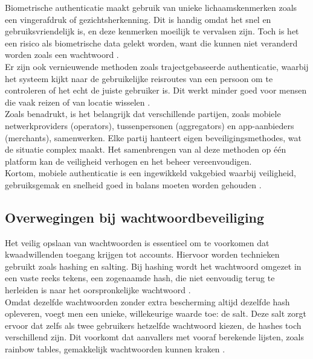 Biometrische authenticatie maakt gebruik van unieke lichaamskenmerken zoals een vingerafdruk of gezichtsherkenning. Dit is handig omdat het snel en gebruiksvriendelijk is, en deze kenmerken moeilijk te vervalsen zijn. Toch is het een risico als biometrische data gelekt worden, want die kunnen niet veranderd worden zoals een wachtwoord \autocite{Zukarnain2022}.\\

Er zijn ook vernieuwende methoden zoals trajectgebaseerde authenticatie, waarbij het systeem kijkt naar de gebruikelijke reisroutes van een persoon om te controleren of het echt de juiste gebruiker is. Dit werkt minder goed voor mensen die vaak reizen of van locatie wisselen \autocite{Zukarnain2022}.\\

Zoals \textcite{Zukarnain2022} benadrukt, is het belangrijk dat verschillende partijen, zoals mobiele netwerkproviders (operators), tussenpersonen (aggregators) en app-aanbieders (merchants), samenwerken. Elke partij hanteert eigen beveiligingsmethodes, wat de situatie complex maakt. Het samenbrengen van al deze methoden op één platform kan de veiligheid verhogen en het beheer vereenvoudigen.\\

Kortom, mobiele authenticatie is een ingewikkeld vakgebied waarbij veiligheid, gebruiksgemak en snelheid goed in balans moeten worden gehouden \autocite{Zukarnain2022, Gao2023}.\\


\subsection{Overwegingen bij wachtwoordbeveiliging}
Het veilig opslaan van wachtwoorden is essentieel om te voorkomen dat kwaadwillenden toegang krijgen tot accounts. Hiervoor worden technieken gebruikt zoals hashing en salting. Bij hashing wordt het wachtwoord omgezet in een vaste reeks tekens, een zogenaamde hash, die niet eenvoudig terug te herleiden is naar het oorspronkelijke wachtwoord \autocite{Gupta2022}.\\

Omdat dezelfde wachtwoorden zonder extra bescherming altijd dezelfde hash opleveren, voegt men een unieke, willekeurige waarde toe: de salt. Deze salt zorgt ervoor dat zelfs als twee gebruikers hetzelfde wachtwoord kiezen, de hashes toch verschillend zijn. Dit voorkomt dat aanvallers met vooraf berekende lijsten, zoals rainbow tables, gemakkelijk wachtwoorden kunnen kraken \autocite{Arias2025}.\\

